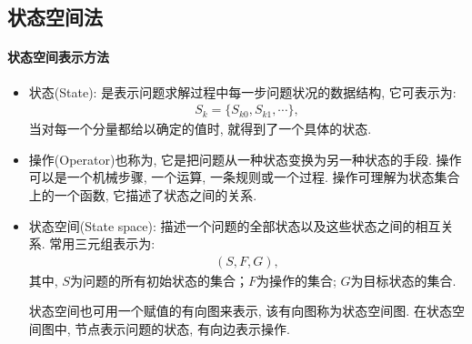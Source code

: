 \subsection{状态空间法}
\paragraph{状态空间表示方法}
\begin{itemize}
\item 状态(State): 是表示问题求解过程中每一步问题状况的数据结构, 它可表示为:
\begin{align}
  S_k=\{S_{k0}, S_{k1}, \cdots\},
\end{align}
当对每一个分量都给以确定的值时, 就得到了一个具体的状态.

\item 操作(Operator)也称为, 它是把问题从一种状态变换为另一种状态的手段.
操作可以是一个机械步骤, 一个运算, 一条规则或一个过程. 操作可理解为状态集合上的一个函数, 它描述了状态之间的关系.

\item 状态空间(State space): 描述一个问题的全部状态以及这些状态之间的相互关系. 常用三元组表示为:
\begin{align}
  (S, F, G),
\end{align}
其中, $S$为问题的所有初始状态的集合；$F$为操作的集合; $G$为目标状态的集合.

\begin{remark}
  状态空间也可用一个赋值的有向图来表示, 该有向图称为状态空间图. 在状态空间图中, 节点表示问题的状态, 有向边表示操作.
\end{remark}
\end{itemize}
